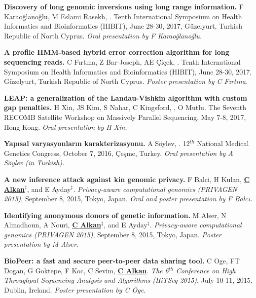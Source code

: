 \vspace{-.2cm}
       {\bf Discovery of long genomic inversions using long range information.} F Karaoğlanoğlu, M Eslami Rasekh, \calkan{}.
       Tenth International Symposium on Health Informatics and Bioinformatics (HIBIT), June 28-30, 2017, Güzelyurt, Turkish Republic of North Cyprus.
       {\it Oral presentation by F Karaoğlanoğlu.}

\vspace{-.2cm}
       {\bf A profile HMM-based hybrid error correction algorithm for long sequencing reads.} C Fırtına, Z Bar-Joseph, AE Çiçek, \calkan{}.
       Tenth International Symposium on Health Informatics and Bioinformatics (HIBIT), June 28-30, 2017, Güzelyurt, Turkish Republic of North Cyprus.
       {\it Poster presentation by C Fırtına.}

\vspace{-.2cm}
       {\bf LEAP: a generalization of the Landau-Vishkin algorithm with custom gap penalties.} H Xin, JS Kim, S Nahar, C Kingsford, \calkan{}, O Mutlu.
       The Seventh RECOMB Satellite Workshop on Massively Parallel Sequencing, May 7-8, 2017, Hong Kong.
       {\it Oral presentation by H Xin.}

\vspace{-.2cm}
       {\bf Yapısal varyasyonların karakterizasyonu.} A Söylev, \calkan{}. 12$^{th}$ National Medical Genetics Congress, October 7, 2016, Çeşme, Turkey.
       {\it Oral presentation by A Söylev (in Turkish).}
       
\vspace{-.2cm}
{\bf  A new inference attack against kin genomic privacy.}
F Balci, H Kulan, {\bf {\underline{C Alkan}}}$^\ddag$, and E Ayday$^\ddag$. 
{\em Privacy-aware computational genomics (PRIVAGEN 2015)}, 
 September 8, 2015, Tokyo, Japan. {\it Oral and poster presentation by F Balcı.}

 \vspace{-.2cm}
{\bf Identifying anonymous donors of genetic information.}
M Alser, N Almadhoun, A Nouri, {\bf {\underline{C Alkan}}}$^\ddag$, and E Ayday$^\ddag$. 
{\em Privacy-aware computational genomics (PRIVAGEN 2015)}, 
 September 8, 2015, Tokyo, Japan. {\it Poster presentation by M Alser.}


\vspace{-.2cm}
 {\bf BioPeer: a fast and secure peer-to-peer data sharing tool.}
  C Oge, FT Dogan, G Goktepe, F Koc, C Sevim, {\bf {\underline{C Alkan}}}.
{\em The 6$^{th}$ Conference on High Throughput Sequencing Analysis and Algorithms (HiTSeq 2015)}, 
July 10-11, 2015, Dublin, Ireland. {\it Poster presentation by C Öge.}

